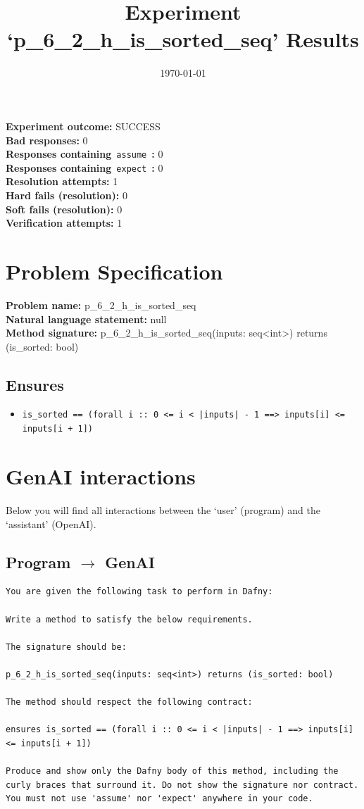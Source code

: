 \documentclass{article}
\begin{document}
\title{Experiment `p\_6\_2\_h\_is\_sorted\_seq' Results}
\author{\today}
\date{}
\maketitle
\textbf{Experiment outcome: }SUCCESS
\\\textbf{Bad responses: }0
\\\textbf{Responses containing}~\texttt{assume}~\textbf{: }0
\\\textbf{Responses containing}~\texttt{expect}~\textbf{: }0
\\\textbf{Resolution attempts: }1
\\\textbf{Hard fails (resolution): }0
\\\textbf{Soft fails (resolution): }0
\\\textbf{Verification attempts: }1
\section*{Problem Specification}
\textbf{Problem name: }p\_6\_2\_h\_is\_sorted\_seq
\\\textbf{Natural language statement: }null
\\\textbf{Method signature: }p\_6\_2\_h\_is\_sorted\_seq(inputs: seq<int>) returns (is\_sorted: bool)
\subsection*{Ensures}
\begin{itemize}
\item \texttt{is\_sorted == (forall i :: 0 <= i < |inputs| - 1 ==> inputs[i] <= inputs[i + 1])}
\end{itemize}
\clearpage
\section*{GenAI interactions}
Below you will find all interactions between the `user' (program) and the `assistant' (OpenAI).
\subsection*{Program $\rightarrow$ GenAI}
\begin{lstlisting}
You are given the following task to perform in Dafny:

Write a method to satisfy the below requirements.

The signature should be:

p_6_2_h_is_sorted_seq(inputs: seq<int>) returns (is_sorted: bool)

The method should respect the following contract:

ensures is_sorted == (forall i :: 0 <= i < |inputs| - 1 ==> inputs[i] <= inputs[i + 1])

Produce and show only the Dafny body of this method, including the curly braces that surround it. Do not show the signature nor contract. You must not use 'assume' nor 'expect' anywhere in your code.
\end{lstlisting}
\end{document}
